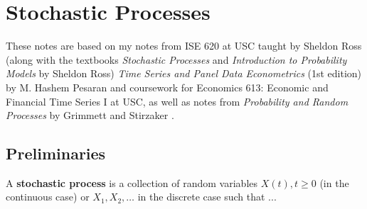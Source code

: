 %
%
%
%
%
%
%
%
%
%
%
%
%
%

\section{Stochastic Processes}

These notes are based on my notes from ISE 620 at USC taught by Sheldon Ross (along with the textbooks \textit{Stochastic Processes} \citep{ross2008stochastic} and \textit{Introduction to Probability Models} \citep{2014i} by Sheldon Ross) \textit{Time Series and Panel Data Econometrics} (1st edition) by M. Hashem Pesaran \citep{pesaran-2015-text} and coursework for Economics 613: Economic and Financial Time Series I at USC, as well as notes from \textit{Probability and Random Processes} by Grimmett and Stirzaker \citep{grimmett2001probability}.

\subsection{Preliminaries}

\begin{definition} A \textbf{stochastic process} is a collection of random variables \(X(t), t\geq 0\) (in the continuous case) or \(X_1, X_2, \ldots\) in the discrete case such that ...

\end{definition}

